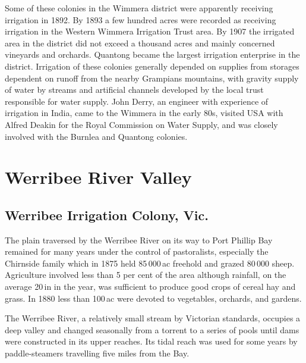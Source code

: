 Some of these colonies in the Wimmera district were apparently
receiving irrigation in 1892.  By 1893 a few
hundred acres were recorded as receiving irrigation in the Western
Wimmera Irrigation Trust area.  By 1907 the irrigated area in the district did
not exceed a thousand acres and mainly concerned vineyards and
orchards.
Quantong became the largest irrigation enterprise in the district.
Irrigation of these colonies generally depended on supplies from
storages dependent on runoff from the nearby Grampians mountains, with
gravity supply of water by streams and artificial channels developed
by the local trust responsible for water supply. John Derry, an
engineer with experience of irrigation in India, came to the Wimmera
in the early 80s, visited USA with Alfred Deakin for the Royal
Commission on Water Supply, and was closely involved with the Burnlea
and Quantong colonies.

\section*{Werribee River Valley}

\subsection*{Werribee Irrigation Colony, Vic.}

The plain traversed by the Werribee River on its way to Port Phillip
Bay remained for many years under the control of pastoralists,
especially the Chirnside family which in 1875 held 85\,000\,ac
freehold and grazed 80\,000 sheep.  Agriculture involved less than 5
per cent of the area although rainfall, on the average 20\,in in the
year, was sufficient to produce good crops of cereal hay and grass.
In 1880 less than 100\,ac were devoted to vegetables, orchards, and
gardens.

The Werribee River, a relatively small stream by Victorian standards,
occupies a deep valley and changed seasonally from a torrent to a
series of pools until dams were constructed in its upper reaches.  Its
tidal reach was used for some years by paddle-steamers travelling five
miles from the Bay.

